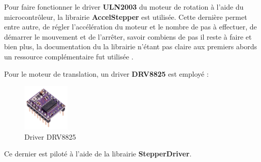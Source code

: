 Pour faire fonctionner le driver \textbf{ULN2003} du moteur de rotation à l'aide du microcontrôleur, la librairie \textbf{AccelStepper}\autocite{librairie_accelstepper} est utilisée.
Cette dernière permet entre autre, de régler l'accélération du moteur et le nombre de pas à effectuer, de démarrer le mouvement et de l'arrêter, savoir combiens de pas il reste à faire et bien plus,
la documentation du la librairie n'étant pas claire aux premiers abords un ressource complémentaire fut utilisée \autocite{AccelStepper_manual}.

Pour le moteur de translation, un driver \textbf{DRV8825} est employé :

\begin{figure}[H]
    \centering
    \includegraphics[width = 0.2\textwidth]{assets/figures/ameliorations/drv-8825.jpg}
    \caption[Driver DRV8825]{Driver DRV8825 \autocite{driver_DRV8825}\footnotemark}
\end{figure}
Ce dernier est piloté à l'aide de la librairie \textbf{StepperDriver}\cite{stepperDriver_lib}\footnotemark.


